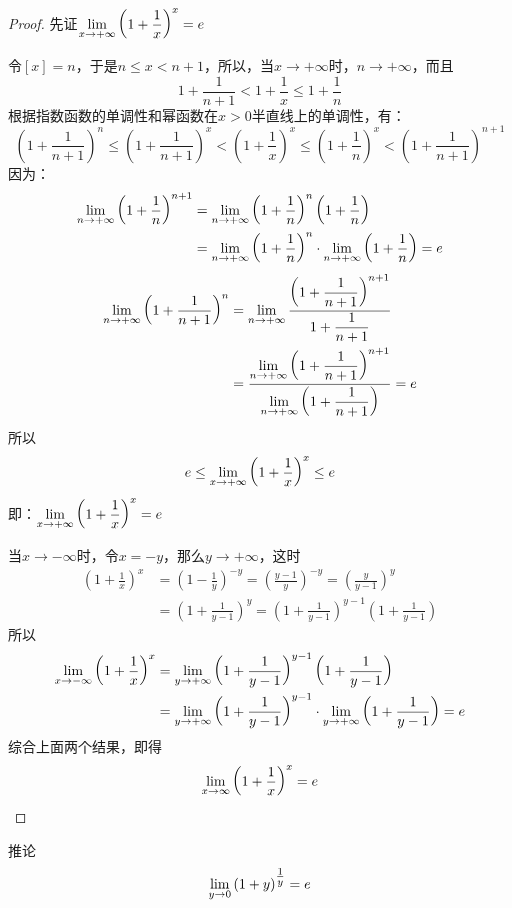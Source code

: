 \begin{proof}
先证$\displaystyle\lim_{x\to +\infty} \left(1+\dfrac{1}{x}\right)^x=e$

令$[x]=n$，于是$n\le x<n+1$，所以，当$x\to +\infty$时，$n\to +\infty$，而且
\[1+\frac{1}{n+1}<1+\frac{1}{x}\le 1+\frac{1}{n}\]
根据指数函数的单调性和幂函数在$x>0$半直线上的单调性，有：
\[\left(1+\frac{1}{n+1}\right)^n\le \left(1+\frac{1}{n+1}\right)^x<\left(1+\frac{1}{x}\right)^x\le \left(1+\frac{1}{n}\right)^x<\left(1+\frac{1}{n+1}\right)^{n+1}\]
因为：
\[\begin{split}
    \displaystyle\lim_{n\to +\infty} \left(1+\dfrac{1}{n}\right)^{n+1}&=\displaystyle\lim_{n\to +\infty} \left(1+\dfrac{1}{n}\right)^{n}\left(1+\dfrac{1}{n}\right)\\
&=\displaystyle\lim_{n\to +\infty} \left(1+\dfrac{1}{n}\right)^{n}\cdot \displaystyle\lim_{n\to +\infty} \left(1+\dfrac{1}{n}\right)=e
\end{split}\]
\[\begin{split}
    \displaystyle\lim_{n\to +\infty} \left(1+\dfrac{1}{n+1}\right)^{n}&=\displaystyle\lim_{n\to +\infty} \dfrac{\left(1+\dfrac{1}{n+1}\right)^{n+1}}{1+\dfrac{1}{n+1}}\\
    &=\dfrac{\displaystyle\lim_{n\to +\infty}\left(1+\dfrac{1}{n+1}\right)^{n+1} }{\displaystyle\lim_{n\to +\infty}\left(1+\dfrac{1}{n+1}\right) }=e
\end{split}\]
所以
\[e\le\displaystyle\lim_{x\to +\infty}\left(1+\dfrac{1}{x}\right)^{x} \le e\]
即：$\displaystyle\lim_{x\to +\infty}\left(1+\dfrac{1}{x}\right)^{x}=e$

当$x\to -\infty$时，令$x=-y$，那么$y\to +\infty$，这时
\[\begin{split}
    \left(1+\frac{1}{x}\right)^x&=\left(1-\frac{1}{y}\right)^{-y}=\left(\frac{y-1}{y}\right)^{-y}=\left(\frac{y}{y-1}\right)^y\\
    &=\left(1+\frac{1}{y-1}\right)^y=\left(1+\frac{1}{y-1}\right)^{y-1}\left(1+\frac{1}{y-1}\right)
\end{split}\]
所以
\[\begin{split}
    \displaystyle\lim_{x\to -\infty}\left(1+\dfrac{1}{x}\right)^{x}&=\displaystyle\lim_{y\to +\infty}\left(1+\dfrac{1}{y-1}\right)^{y-1}\left(1+\dfrac{1}{y-1}\right)\\
    &=\displaystyle\lim_{y\to +\infty}\left(1+\dfrac{1}{y-1}\right)^{y-1}\cdot \displaystyle\lim_{y\to +\infty}\left(1+\dfrac{1}{y-1}\right)=e
\end{split}\]
综合上面两个结果，即得
$$\displaystyle\lim_{x\to \infty}\left(1+\dfrac{1}{x}\right)^{x}=e$$
\end{proof}

\begin{blk}{推论}
\[\displaystyle\lim_{y\to 0}\left(1+y\right)^{\tfrac{1}{y}}=e\]
\end{blk}


